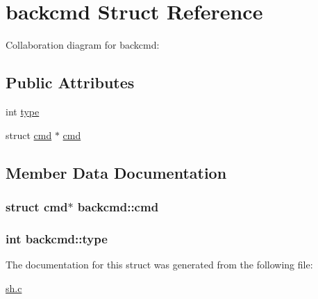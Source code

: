 \hypertarget{structbackcmd}{}\section{backcmd Struct Reference}
\label{structbackcmd}


Collaboration diagram for backcmd\+:
\subsection*{Public Attributes}
\begin{DoxyCompactItemize}
\item 
int \hyperlink{structbackcmd_a38298e998fc63358cc59f1e0dcf85a38}{type}
\item 
struct \hyperlink{structcmd}{cmd} $\ast$ \hyperlink{structbackcmd_a74a697014e2d3a17710e530fca0e8432}{cmd}
\end{DoxyCompactItemize}


\subsection{Member Data Documentation}
\subsubsection[{\texorpdfstring{cmd}{cmd}}]{\setlength{\rightskip}{0pt plus 5cm}struct {\bf cmd}$\ast$ backcmd\+::cmd}\hypertarget{structbackcmd_a74a697014e2d3a17710e530fca0e8432}{}\label{structbackcmd_a74a697014e2d3a17710e530fca0e8432}
\subsubsection[{\texorpdfstring{type}{type}}]{\setlength{\rightskip}{0pt plus 5cm}int backcmd\+::type}\hypertarget{structbackcmd_a38298e998fc63358cc59f1e0dcf85a38}{}\label{structbackcmd_a38298e998fc63358cc59f1e0dcf85a38}


The documentation for this struct was generated from the following file\+:\begin{DoxyCompactItemize}
\item 
\hyperlink{sh_8c}{sh.\+c}\end{DoxyCompactItemize}
